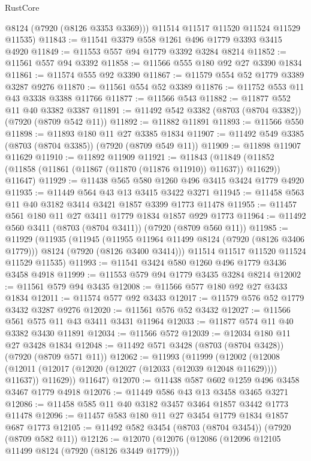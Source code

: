 \begin{lexlean}{RustCore}
\begin{coremodule}
        @8124
        (@7920 (@8126 @3353 @3369)))
      @11514
      @11517
      @11520
      @11524
      @11529
      @11535)
@11843 := @11541 @3379 @558 @1261 @496 @1779 @3393 @3415 @4920
@11849 := @11553 @557 @94 @1779 @3392 @3284 @8214
@11852 := @11561 @557 @94 @3392
@11858 := @11566 @555 @180 @92 @27 @3390 @1834
@11861 := @11574 @555 @92 @3390
@11867 := @11579 @554 @52 @1779 @3389 @3287 @9276
@11870 := @11561 @554 @52 @3389
@11876 := @11752 @553 @11 @43 @3338 @3388 @11766
@11877 := @11566 @543
@11882 := @11877 @552 @11 @40 @3382 @3387
@11891 := @11492 @542 @3382 (@8703 (@8704 @3382)) (@7920 (@8709 @542 @11))
@11892 := @11882 @11891
@11893 := @11566 @550
@11898 := @11893 @180 @11 @27 @3385 @1834
@11907 := @11492 @549 @3385 (@8703 (@8704 @3385)) (@7920 (@8709 @549 @11))
@11909 := @11898 @11907 @11629
@11910 := @11892 @11909
@11921 := @11843
    (@11849 (@11852 (@11858 (@11861 (@11867 (@11870 (@11876 @11910)) @11637)) @11629)) @11647)
@11929 := @11438 @565 @580 @1260 @496 @3415 @3424 @1779 @4920
@11935 := @11449 @564 @43 @13 @3415 @3422 @3271
@11945 := @11458 @563 @11 @40 @3182 @3414 @3421 @1857 @3399 @1773 @11478
@11955 := @11457 @561 @180 @11 @27 @3411 @1779 @1834 @1857 @929 @1773
@11964 := @11492 @560 @3411 (@8703 (@8704 @3411)) (@7920 (@8709 @560 @11))
@11985 := @11929
    (@11935
      (@11945
        (@11955 @11964 @11499 @8124 (@7920 (@8126 @3406 @1779)))
        @8124
        (@7920 (@8126 @3400 @3414)))
      @11514
      @11517
      @11520
      @11524
      @11529
      @11535)
@11993 := @11541 @3424 @580 @1260 @496 @1779 @3436 @3458 @4918
@11999 := @11553 @579 @94 @1779 @3435 @3284 @8214
@12002 := @11561 @579 @94 @3435
@12008 := @11566 @577 @180 @92 @27 @3433 @1834
@12011 := @11574 @577 @92 @3433
@12017 := @11579 @576 @52 @1779 @3432 @3287 @9276
@12020 := @11561 @576 @52 @3432
@12027 := @11566 @561 @575 @11 @43 @3411 @3431 @11964
@12033 := @11877 @574 @11 @40 @3382 @3430 @11891
@12034 := @11566 @572
@12039 := @12034 @180 @11 @27 @3428 @1834
@12048 := @11492 @571 @3428 (@8703 (@8704 @3428)) (@7920 (@8709 @571 @11))
@12062 := @11993
    (@11999
      (@12002
        (@12008 (@12011 (@12017 (@12020 (@12027 (@12033 (@12039 @12048 @11629)))) @11637)) @11629))
      @11647)
@12070 := @11438 @587 @602 @1259 @496 @3458 @3467 @1779 @4918
@12076 := @11449 @586 @43 @13 @3458 @3465 @3271
@12086 := @11458 @585 @11 @40 @3182 @3457 @3464 @1857 @3442 @1773 @11478
@12096 := @11457 @583 @180 @11 @27 @3454 @1779 @1834 @1857 @687 @1773
@12105 := @11492 @582 @3454 (@8703 (@8704 @3454)) (@7920 (@8709 @582 @11))
@12126 := @12070
    (@12076
      (@12086
        (@12096 @12105 @11499 @8124 (@7920 (@8126 @3449 @1779)))

\end{coremodule}
\end{lexlean}

